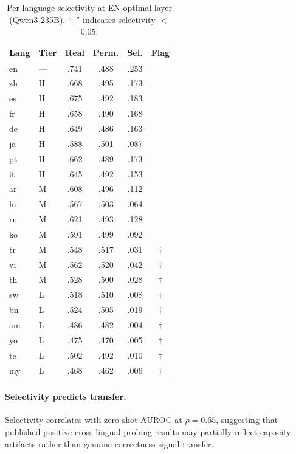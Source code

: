 \documentclass[11pt,a4paper]{article}
\begin{document}
\begin{table}[t]
\centering
\small
\caption{Per-language selectivity at EN-optimal layer (Qwen3-235B). ``$\dagger$'' indicates selectivity $<$ 0.05.}
\label{tab:selectivity}
\begin{tabular}{llcccc}
\toprule
Lang & Tier & Real & Perm. & Sel. & Flag \\
\midrule
en & --- & .741 & .488 & .253 & \\
zh & H & .668 & .495 & .173 & \\
es & H & .675 & .492 & .183 & \\
fr & H & .658 & .490 & .168 & \\
de & H & .649 & .486 & .163 & \\
ja & H & .588 & .501 & .087 & \\
pt & H & .662 & .489 & .173 & \\
it & H & .645 & .492 & .153 & \\
ar & M & .608 & .496 & .112 & \\
hi & M & .567 & .503 & .064 & \\
ru & M & .621 & .493 & .128 & \\
ko & M & .591 & .499 & .092 & \\
tr & M & .548 & .517 & .031 & $\dagger$ \\
vi & M & .562 & .520 & .042 & $\dagger$ \\
th & M & .528 & .500 & .028 & $\dagger$ \\
sw & L & .518 & .510 & .008 & $\dagger$ \\
bn & L & .524 & .505 & .019 & $\dagger$ \\
am & L & .486 & .482 & .004 & $\dagger$ \\
yo & L & .475 & .470 & .005 & $\dagger$ \\
te & L & .502 & .492 & .010 & $\dagger$ \\
my & L & .468 & .462 & .006 & $\dagger$ \\
\bottomrule
\end{tabular}
\end{table}

\paragraph{Selectivity predicts transfer.}
Selectivity correlates with zero-shot AUROC at $\rho{=}0.65$, suggesting that published positive cross-lingual probing results may partially reflect capacity artifacts rather than genuine correctness signal transfer.
\end{document}
